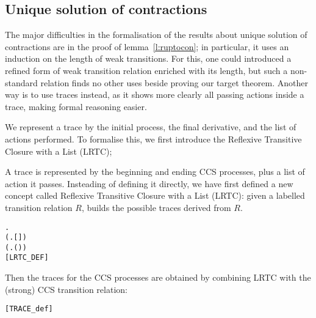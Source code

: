 
\subsection{Unique solution of contractions}

The major difficulties in the formalisation of the results about unique solution of
contractions are in the proof of lemma~\ref{l:ruptocon}; in particular, it
uses an induction on the length of weak transitions. 
For this, one could introduced a refined form of weak transition relation
enriched with its length, but such a non-standard relation finds no
other uses beside proving our target theorem. Another way is to use 
traces instead, as it shows more clearly all passing actions inside a
trace, making formal reasoning easier.

We represent a trace by the initial process, the final derivative, and
the list of actions performed. 
To formalise this, 
we first introduce 
the Reflexive Transitive Closure with a
List (LRTC);

A trace is represented by the beginning and ending CCS processes, plus
a list of action it passes. Insteading of defining it directly, we
have first defined a new concept called Reflexive Transitive Closure with a
List (LRTC):
given a  labelled transition relation $R$,  builds 
the possible traces derived from $R$.
\begin{alltt}
\HOLTokenTurnstile{}      \HOLSymConst{\HOLTokenEquiv{}}
   \HOLSymConst{\HOLTokenForall{}}.
       (\HOLSymConst{\HOLTokenForall{}}.   [] ) \HOLSymConst{\HOLTokenConj{}}
       (\HOLSymConst{\HOLTokenForall{}}    .     \HOLSymConst{\HOLTokenConj{}}     \HOLSymConst{\HOLTokenImp{}}   (\HOLSymConst{::}) ) \HOLSymConst{\HOLTokenImp{}}
          \hfill{[LRTC_DEF]}
\end{alltt}
 Then the traces for the  CCS processes
are obtained
 by combining LRTC with the (strong) CCS transition
relation:
\begin{alltt}
 \HOLSymConst{=}  \hfill{[TRACE_def]}
\end{alltt}

